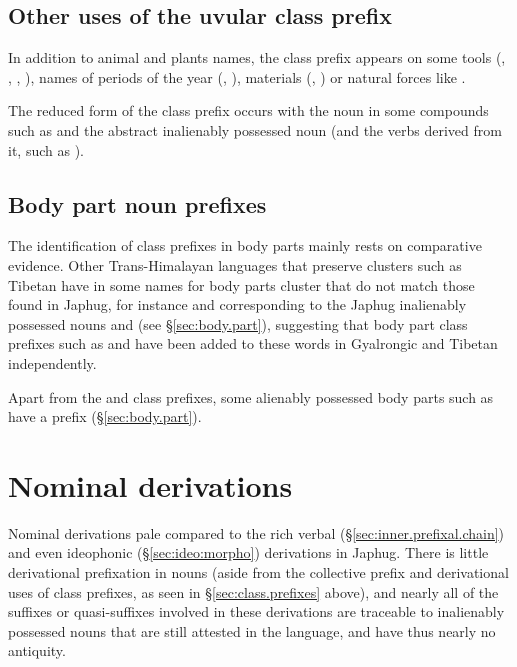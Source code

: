 \subsection{Other uses of the uvular class prefix} \label{sec:uvular.other}
In addition to animal and plants names, the class prefix  appears on some tools (, , , 
), names of periods of the year (, ), materials (, ) or natural forces like .

The reduced form  of the class prefix occurs with the noun  in some compounds such as  and the abstract inalienably possessed noun  (and the verbs derived from it, such as ).
  
\subsection{Body part noun prefixes}  \label{ex:body.part.prefix}
The identification of class prefixes in body parts mainly rests on comparative evidence. Other Trans-Himalayan languages that preserve clusters such as Tibetan have in some names for body parts cluster that do not match those found in Japhug, for instance  and  corresponding to the Japhug inalienably possessed nouns  and  (see §\ref{sec:body.part}), suggesting that body part class prefixes such as  and  have been added to these words in Gyalrongic and Tibetan independently.

Apart from the  and  class prefixes, some alienably possessed body parts such as  have a   prefix (§\ref{sec:body.part}).

\section{Nominal derivations}
Nominal derivations pale compared to the rich verbal (§\ref{sec:inner.prefixal.chain}) and even ideophonic (§\ref{sec:ideo:morpho}) derivations in Japhug. There is little derivational prefixation in nouns (aside from the collective  prefix and derivational uses of class prefixes, as seen in §\ref{sec:class.prefixes} above), and nearly all of the suffixes or quasi-suffixes involved in these derivations are traceable to inalienably possessed nouns that are still attested in the language, and have thus nearly no antiquity. 

